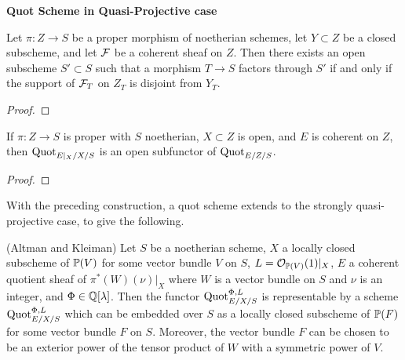 
\medskip

\centerline{\large\bf Quot Scheme in Quasi-Projective case}


\medskip

\begin{claim}\label{nhq-support-disjoint-open}
Let $\pi: Z\to S$ be a proper morphism of noetherian schemes, let
$Y\subset Z$ be a closed subscheme, and let $\mathcal{F}$ be a coherent sheaf on
$Z$. Then there exists an open subscheme $S'\subset S$ such that a
morphism $T\to S$ factors through $S'$ if and only if the support of
$\mathcal{F}_T$ on $Z_T$ is disjoint from $Y_T$.
\end{claim}

\begin{proof}
\notready
\end{proof}

\begin{claim}\label{nhq-open-quot-subfunctor}
If $\pi: Z\to S$ is proper with $S$ noetherian, $X\subset Z$ is open,
and $E$ is coherent on $Z$, then $\operatorname{Quot}_{E|_X/X/S}$ is an open subfunctor
of $\operatorname{Quot}_{E/Z/S}$.
\end{claim}

\begin{proof}
\notready
\end{proof}

With the preceding construction, a quot scheme extends to the strongly
quasi-projective case, to give the following.

\begin{theorem}\label{nhq-strongly-quasi-projective-quot}
{\rm (Altman and Kleiman)}
Let $S$ be a noetherian scheme, $X$ a locally closed subscheme of
$\mathbb{P}(V)$ for some vector bundle $V$ on $S$, $L = {\mathcal O}_{\mathbb{P}(V)}(1)|_X$,
$E$ a coherent quotient sheaf of $\pi^*(W)(\nu)|_X$ where
$W$ is a vector bundle on $S$ and $\nu$ is an integer, and
$\Phi \in \mathbb{Q}[\lambda]$.
Then the functor $\operatorname{Quot}_{E/X/S}^{\Phi,L}$ is representable
by a scheme $\operatorname{Quot}_{E/X/S}^{\Phi,L}$ which can be embedded over $S$ as a
locally closed subscheme of $\mathbb{P}(F)$ for some vector bundle $F$ on $S$.
Moreover, the vector bundle $F$ can be chosen to be an exterior power of
the tensor product of $W$ with a symmetric power of $V$.
\end{theorem}

